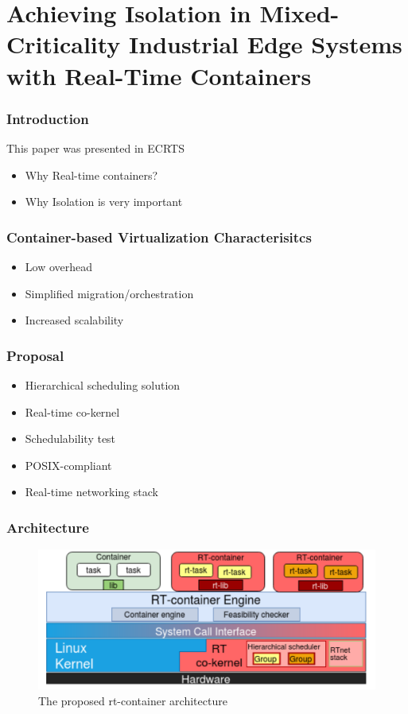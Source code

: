 \documentclass{beamer}
\begin{document}
\section{Achieving Isolation in Mixed-
Criticality Industrial Edge
Systems with Real-Time
Containers}
\begin{frame}
    \frametitle{Introduction}
    This paper was presented in ECRTS \cite{barletta2022achieving}
    \begin{itemize}
        \item Why Real-time containers?
        \item Why Isolation is very important
    \end{itemize}
\end{frame}

\begin{frame}
    \frametitle{Container-based Virtualization Characterisitcs}
    \begin{itemize}
        \item Low overhead
        \item Simplified migration/orchestration
        \item Increased scalability
    \end{itemize}
\end{frame}

\begin{frame}
    \frametitle{Proposal}
    \begin{itemize}
        \item Hierarchical scheduling solution
        \item Real-time co-kernel
        \item Schedulability test
        \item POSIX-compliant
        \item Real-time networking stack
    \end{itemize}
\end{frame}

\begin{frame}
    \frametitle{Architecture}
    \begin{figure}
        \centering
        \includegraphics[width=1.0\textwidth]{mcs.png}
        \caption{The proposed rt-container architecture}
        \label{fig:mcs}
    \end{figure}
\end{frame}
\end{document}
